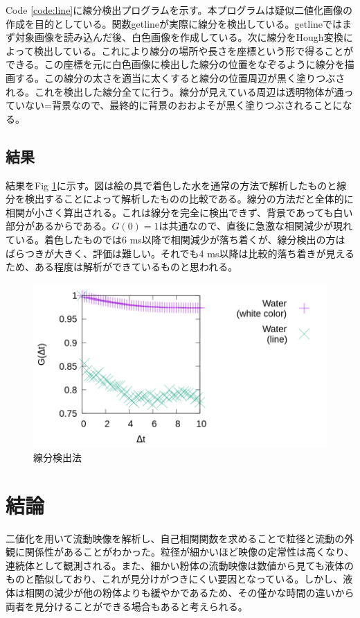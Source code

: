 \documentclass[a4paper,12pt,dvipdfmx]{jsarticle}
\begin{document}
Code \ref{code:line}に線分検出プログラムを示す。本プログラムは疑似二値化画像の作成を目的としている。関数getlineが実際に線分を検出している。getlineではまず対象画像を読み込んだ後、白色画像を作成している。次に線分をHough変換によって検出している。これにより線分の場所や長さを座標という形で得ることができる。この座標を元に白色画像に検出した線分の位置をなぞるように線分を描画する。この線分の太さを適当に太くすると線分の位置周辺が黒く塗りつぶされる。これを検出した線分全てに行う。線分が見えている周辺は透明物体が通っていない=背景なので、最終的に背景のおおよそが黒く塗りつぶされることになる。

\subsection{結果}
結果をFig \ref{fig:compare}に示す。図は絵の具で着色した水を通常の方法で解析したものと線分を検出することによって解析したものの比較である。線分の方法だと全体的に相関が小さく算出される。これは線分を完全に検出できず、背景であっても白い部分があるからである。$G(0)=1$は共通なので、直後に急激な相関減少が現れている。着色したものでは6 ms以降で相関減少が落ち着くが、線分検出の方はばらつきが大きく、評価は難しい。それでも4 ms以降は比較的落ち着きが見えるため、ある程度は解析ができているものと思われる。
\begin{figure}[H]
	\includegraphics[scale=0.4]{compareline.png}
	\caption{線分検出法}
	\label{fig:compare}
\end{figure}
\section{結論}
二値化を用いて流動映像を解析し、自己相関関数を求めることで粒径と流動の外観に関係性があることがわかった。粒径が細かいほど映像の定常性は高くなり、連続体として観測される。また、細かい粉体の流動映像は数値から見ても液体のものと酷似しており、これが見分けがつきにくい要因となっている。しかし、液体は相関の減少が他の粉体よりも緩やかであるため、その僅かな時間の違いから両者を見分けることができる場合もあると考えられる。
\end{document}
